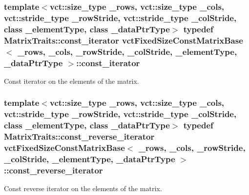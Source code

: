 \subsubsection[{const\+\_\+iterator}]{\setlength{\rightskip}{0pt plus 5cm}template$<$vct\+::size\+\_\+type \+\_\+rows, vct\+::size\+\_\+type \+\_\+cols, vct\+::stride\+\_\+type \+\_\+row\+Stride, vct\+::stride\+\_\+type \+\_\+col\+Stride, class \+\_\+element\+Type, class \+\_\+data\+Ptr\+Type$>$ typedef {\bf Matrix\+Traits\+::const\+\_\+iterator} {\bf vct\+Fixed\+Size\+Const\+Matrix\+Base}$<$ \+\_\+rows, \+\_\+cols, \+\_\+row\+Stride, \+\_\+col\+Stride, \+\_\+element\+Type, \+\_\+data\+Ptr\+Type $>$\+::{\bf const\+\_\+iterator}}\label{classvct_fixed_size_const_matrix_base_a896eacc5ccf7915b3e109bf9dbded884}
Const iterator on the elements of the matrix. \hypertarget{classvct_fixed_size_const_matrix_base_a86918b3da51e15dce72b62abdc6378fa}{}
\subsubsection[{const\+\_\+reverse\+\_\+iterator}]{\setlength{\rightskip}{0pt plus 5cm}template$<$vct\+::size\+\_\+type \+\_\+rows, vct\+::size\+\_\+type \+\_\+cols, vct\+::stride\+\_\+type \+\_\+row\+Stride, vct\+::stride\+\_\+type \+\_\+col\+Stride, class \+\_\+element\+Type, class \+\_\+data\+Ptr\+Type$>$ typedef {\bf Matrix\+Traits\+::const\+\_\+reverse\+\_\+iterator} {\bf vct\+Fixed\+Size\+Const\+Matrix\+Base}$<$ \+\_\+rows, \+\_\+cols, \+\_\+row\+Stride, \+\_\+col\+Stride, \+\_\+element\+Type, \+\_\+data\+Ptr\+Type $>$\+::{\bf const\+\_\+reverse\+\_\+iterator}}\label{classvct_fixed_size_const_matrix_base_a86918b3da51e15dce72b62abdc6378fa}
Const reverse iterator on the elements of the matrix. \hypertarget{classvct_fixed_size_const_matrix_base_a68ed47f84a2855832fa0c18fafda6843}{}
